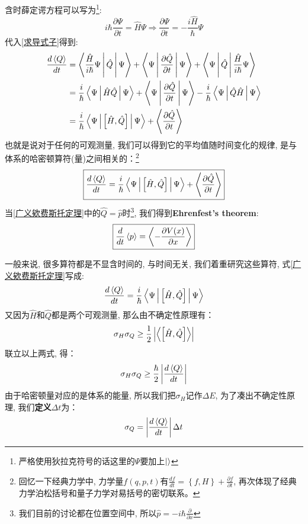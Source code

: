 \documentclass[a4paper,zihao=-4,linespread=1]{ctexrep}
\begin{document}
    含时薛定谔方程可以写为\footnote{严格使用狄拉克符号的话这里的$\Psi$要加上$\ket{}$}:
    \[i\hbar\frac{\partial \Psi}{\partial t}=\hat H\Psi\Rightarrow\frac{\partial \Psi}{\partial t}=-\frac{i\hat H}{\hbar}\Psi\]
    代入\ref{求导式子}得到:
    \begin{align*}
        \frac{d\braket{Q}}{dt}&=\Braket{\frac{\hat{H}}{i\hbar}\Psi |\hat{Q}|\Psi}+\Braket{\Psi|\frac{\partial \hat{Q}}{\partial t}|\Psi}+\Braket{\Psi|\hat{Q}| \frac{\hat H}{i\hbar}\Psi}\\
        &=\frac{i}{\hbar}\Braket{\Psi|\hat H\hat Q|\Psi}+\Braket{\Psi|\frac{\partial \hat{Q}}{\partial t}|\Psi}-\frac{i}{\hbar}\Braket{\Psi|\hat Q\hat H|\Psi}\\
        &=\frac{i}{\hbar}\Braket{\Psi|\left[\hat H,\hat Q\right]|\Psi}+\Braket{\frac{\partial \hat Q}{\partial t}}
    \end{align*}
    也就是说对于任何的可观测量, 我们可以得到它的平均值随时间变化的规律, 是与体系的哈密顿算符(量)之间相关的：\footnote{回忆一下经典力学中, 力学量$f(q,p,t)$有$\frac{df}{dt}=\left\{f,H\right\}+\frac{\partial f}{\partial t}$, 再次体现了经典力学泊松括号和量子力学对易括号的密切联系。}
    \begin{equation}
        \label{广义欸费斯托定理}
        \boxed{
            \frac{d\braket{Q}}{dt}=\frac{i}{\hbar}\Braket{\Psi|\left[\hat H,\hat Q\right]|\Psi}+\Braket{\frac{\partial \hat Q}{\partial t}}
        }
    \end{equation}
    当\ref{广义欸费斯托定理}中的$\hat Q=\hat p$时\footnote{我们目前的讨论都在位置空间中, 所以$\hat p=-i\hbar\frac{\partial}{\partial x}$}, 我们得到\textbf{Ehrenfest's theorem}:
    \begin{equation}
        \boxed{\frac{d}{dt}\braket{p}=\Braket{-\frac{\partial V(x)}{\partial x}}}
    \end{equation}
    
    一般来说, 很多算符都是不显含时间的, 与时间无关, 我们着重研究这些算符, 式\ref{广义欸费斯托定理}写成:
    \[\frac{d\braket{Q}}{dt}=\frac{i}{\hbar}\Braket{\Psi|\left[\hat H,\hat Q\right]|\Psi}\]
    又因为$\hat{H}$和$\hat{Q}$都是两个可观测量, 那么由不确定性原理有：
    \[\sigma_H\sigma_Q\geq\frac{1}{2}\left|\Braket{\left[\hat H,\hat Q\right]}\right|\]
    联立以上两式, 得：
    \begin{equation}
        \label{H-Q}
        \sigma_H\sigma_Q\geq\frac{\hbar}{2}\left|\frac{d\braket{Q}}{dt}\right|
    \end{equation}
    由于哈密顿量对应的是体系的能量, 所以我们把$\sigma_H$记作$\Delta E$, 为了凑出不确定性原理, 我们\textbf{定义}$\Delta t$为：
    \begin{equation}
        \label{define dt}
        \sigma_Q=\left|\frac{d\braket{Q}}{dt}\right|\Delta t
    \end{equation}
    
\end{document}
